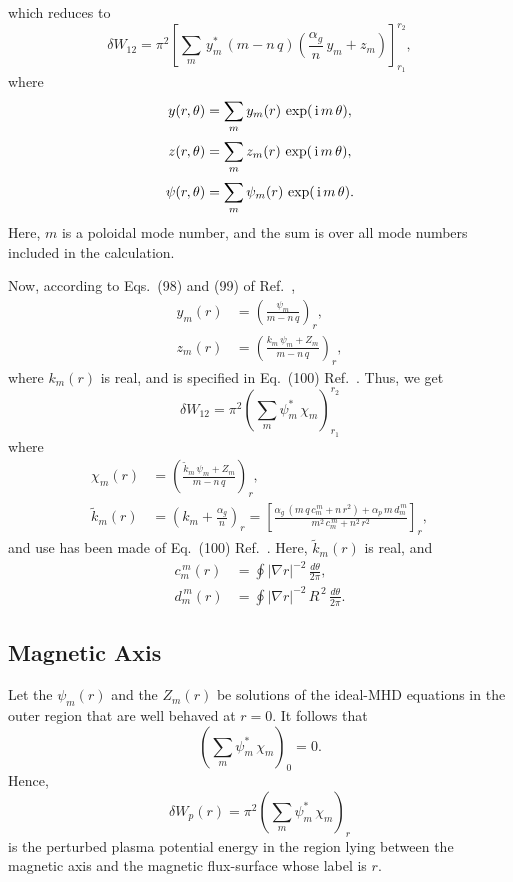 \documentclass[12pt,prb,aps]{revtex4-1}
\begin{document}
which reduces to
\begin{equation}
\delta W_{12}= \pi^2\left[\sum_m\,y_m^\ast\,(m-n\,q)\left(\frac{\alpha_g}{n}\,y_m+z_m\right)\right]_{r_1}^{r_2},
\end{equation}
where
\begin{align}\label{e26}
y(r,\theta)&=\sum_m y_m(r)\,\exp(\,{\rm i}\,m\,\theta),\\[0.5ex]
z(r,\theta)&=\sum_m z_m(r)\,\exp(\,{\rm i}\,m\,\theta),\\[0.5ex]
\psi(r,\theta)&=\sum_m \psi_m(r)\,\exp(\,{\rm i}\,m\,\theta).\label{e28}
\end{align}
Here, $m$ is a poloidal mode number, and the sum is over all mode numbers included in the calculation. 

Now, according to Eqs.~(98) and (99) of Ref.~, 
\begin{align}\label{epsi}
y_m(r) &= \left(\frac{\psi_m}{m-n\,q}\right)_r,\\[0.5ex]
z_m(r)&= \left(\frac{k_m\,\psi_m+Z_m}{m-n\,q}\right)_r,
\end{align}
where
$k_m(r)$ is real, and is specified in Eq.~(100) Ref.~. 
Thus, we get 
\begin{equation}
\delta W_{12}=\pi^2\left(\sum_m\psi_m^\ast\,\chi_m\right)_{r_1}^{r_2}
\end{equation}
where
\begin{align}\label{e29}
\chi_m(r)&=
 \left(\frac{\tilde{k}_m\,\psi_m+Z_m}{m-n\,q}\right)_r,\\[0.5ex]
\tilde{k}_m(r) &=\left( k_m + \frac{\alpha_g}{n} \right)_r= \left[\frac{\alpha_g\,(m\,q\,c_m^{\,m}+n\,r^2)+\alpha_p\,m\,d_m^{\,m}}{m^2\,c_m^{\,m}+n^2\,r^2}\right]_r,\label{e30}
\end{align}
and use has been made of Eq.~(100) Ref.~. Here, $\tilde{k}_m(r)$ is real, and
\begin{align}
c_m^{\,m}(r) &=\oint|\nabla r|^{-2}\,\frac{d\theta}{2\pi},\\[0.5ex]
d_m^{\,m}(r) &=\oint|\nabla r|^{-2}\,R^{\,2}\,\frac{d\theta}{2\pi}.
\end{align}

\subsection{Magnetic Axis}
Let the $\psi_m(r)$ and the $Z_m(r)$ be solutions of the ideal-MHD equations in the outer region that are well behaved at $r=0$. It follows that\,\cite{tj}
\begin{equation}
\left(\sum_m\psi_m^\ast\,\chi_m\right)_{0}=0.
\end{equation}
Hence, 
\begin{equation}\label{e1}
\delta W_p(r) =\pi^2\left(\sum_m\psi_m^\ast\,\chi_m\right)_r
\end{equation}
is the perturbed plasma potential energy in the region lying between the magnetic axis and the magnetic flux-surface whose label is $r$. 
\end{document}
